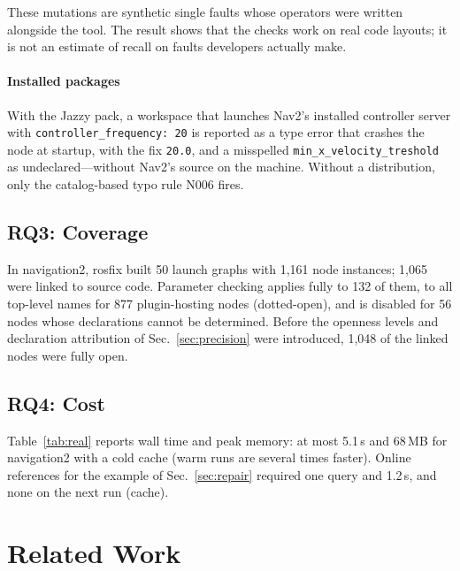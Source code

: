﻿\documentclass[conference]{IEEEtran}
\newcommand{\tool}{\textsf{rosfix}}
\newcommand{\code}[1]{\texttt{#1}}
\begin{document}
These mutations are synthetic single faults whose operators were written alongside the tool. The
result shows that the checks work on real code layouts; it is not an estimate of recall on
faults developers actually make.

\paragraph{Installed packages}
With the Jazzy pack, a workspace that launches Nav2's installed controller server with
\code{controller\_frequency: 20} is reported as a type error that crashes the node at startup,
with the fix \code{20.0}, and a misspelled \code{min\_x\_velocity\_treshold} as undeclared---without
Nav2's source on the machine. Without a distribution, only the catalog-based typo rule N006 fires.

\subsection{RQ3: Coverage}

In navigation2, \tool{} built 50 launch graphs with 1{,}161 node instances; 1{,}065 were linked to
source code. Parameter checking applies fully to 132 of them, to all top-level names for 877
plugin-hosting nodes (dotted-open), and is disabled for 56 nodes whose declarations cannot be
determined. Before the openness levels and declaration attribution of
Sec.~\ref{sec:precision} were introduced, 1{,}048 of the linked nodes were fully open.

\subsection{RQ4: Cost}

Table~\ref{tab:real} reports wall time and peak memory: at most 5.1\,s and 68\,MB for
navigation2 with a cold cache (warm runs are several times faster). Online references for the
example of Sec.~\ref{sec:repair} required one query and 1.2\,s, and none on the next run (cache).

\section{Related Work}
\end{document}
